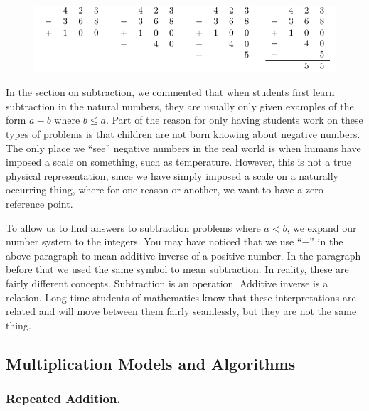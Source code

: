 \documentclass[
]{book}
\theoremstyle{definition}
\theoremstyle{definition}
\theoremstyle{definition}
\theoremstyle{remark}
\begin{document}
\begin{figure}

{\centering \includegraphics[width=0.8\linewidth]{tikz/subtraction-model-partial-differences} 

}

\end{figure}

In the section on subtraction, we commented that when students first learn subtraction in the natural numbers, they are usually only given examples of the form \(a-b\) where \(b\leq a\). Part of the reason for only having students work on these types of problems is that children are not born knowing about negative numbers. The only place we ``see'' negative numbers in the real world is when humans have imposed a scale on something, such as temperature. However, this is not a true physical representation, since we have simply imposed a scale on a naturally occurring thing, where for one reason or another, we want to have a zero reference point.

To allow us to find answers to subtraction problems where \(a<b\), we expand our number system to the integers.
You may have noticed that we use ``\(-\)'' in the above paragraph to mean additive inverse of a positive number. In the paragraph before that we used the same symbol to mean subtraction. In reality, these are fairly different concepts. Subtraction is an operation. Additive inverse is a relation. Long-time students of mathematics know that these interpretations are related and will move between them fairly seamlessly, but they are not the same thing.

\hypertarget{multiplication-models-and-algorithms}{%
\subsection{Multiplication Models and Algorithms}\label{multiplication-models-and-algorithms}}

\hypertarget{repeated-addition.}{%
\subsubsection*{Repeated Addition.}\label{repeated-addition.}}
\end{document}
